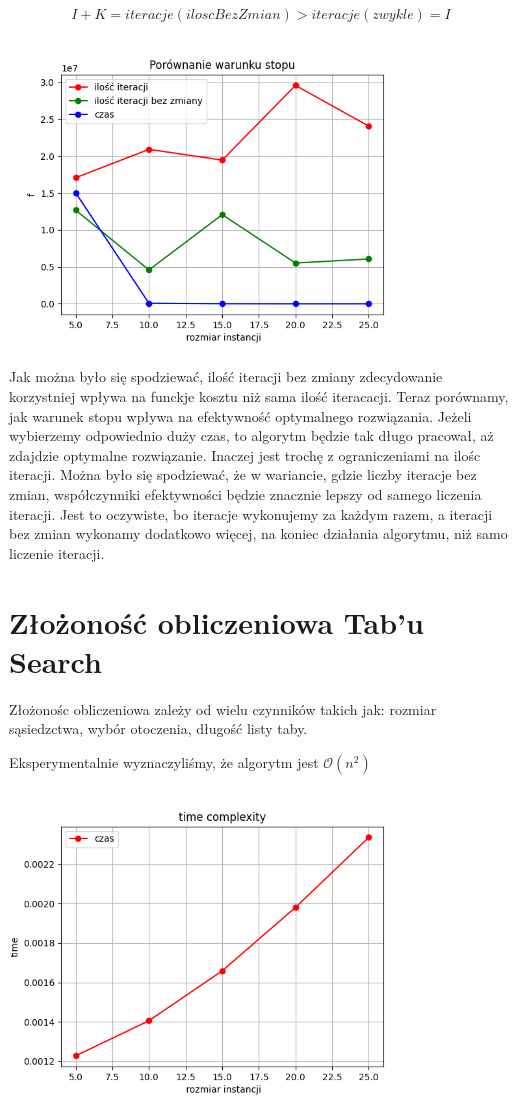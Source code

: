 \documentclass{article}
\begin{document}
    $$I + K = iteracje(iloscBezZmian) > iteracje(zwykle) = I$$

    \includegraphics[width=11cm]{./spr2img/Figure_10.png}
    
    Jak można było się spodziewać, ilość iteracji bez zmiany zdecydowanie korzystniej 
    wpływa na funckje kosztu niż sama ilość iteracacji. Teraz porównamy, jak
    warunek stopu wpływa na efektywność optymalnego rozwiązania. Jeżeli wybierzemy odpowiednio duży czas,
    to algorytm będzie tak długo pracował, aż zdajdzie optymalne rozwiązanie. Inaczej jest trochę
    z ograniczeniami na ilośc iteracji. Można było się spodziewać, że w wariancie, gdzie liczby iteracje
    bez zmian, współczynniki  efektywności będzie znacznie lepszy od samego liczenia iteracji.
    Jest to oczywiste, bo iteracje wykonujemy za każdym razem, a iteracji bez zmian wykonamy dodatkowo więcej,
    na koniec działania algorytmu, niż samo liczenie iteracji.

    \section{Złożoność obliczeniowa Tab'u Search}

    Złożonośc obliczeniowa zależy od wielu czynników takich jak:
    rozmiar sąsiedzctwa, wybór otoczenia, długość listy taby.


    Eksperymentalnie wyznaczyliśmy, że algorytm jest $\mathcal{O}(n^2)$

    \includegraphics[width=11cm]{./spr2img/Figure_11.png}
\end{document}

